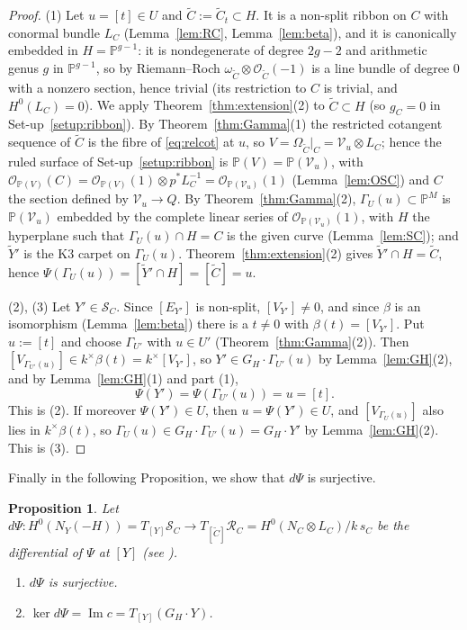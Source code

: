 \documentclass[11pt,twoside]{amsart}
\theoremstyle{plain}
\newtheorem{proposition}[theorem]{Proposition}
\theoremstyle{definition}
\newcommand{\PP}{\mathbb{P}}
\newcommand{\PM}{\mathbb{P}^M}
\newcommand{\OO}{\mathcal{O}}
\renewcommand{\Im}{\operatorname{Im}}
\newcommand{\Yt}{\widetilde{Y}}
\newcommand{\Ct}{\widetilde{C}}
\newcommand{\NY}{N_{Y}}
\newcommand{\SC}{\mathcal{S}_C}
\newcommand{\RC}{\mathcal{R}_C}
\newcommand{\GH}{G_H}
\begin{document}
\begin{proof}
(1) Let $u=[t]\in U$ and $\Ct:=\Ct_t\subset H$. It is a non-split ribbon on $C$ with conormal bundle $L_C$ (Lemma~\ref{lem:RC}, Lemma~\ref{lem:beta}), and it is canonically embedded in $H=\PP^{g-1}$: it is nondegenerate of degree $2g-2$ and arithmetic genus $g$ in $\PP^{g-1}$, so by Riemann--Roch $\omega_{\Ct}\otimes\OO_{\Ct}(-1)$ is a line bundle of degree $0$ with a nonzero section, hence trivial (its restriction to $C$ is trivial, and $H^0(L_C)=0$). We apply Theorem~\ref{thm:extension}(2) to $\Ct\subset H$ (so $g_C=0$ in Set-up~\ref{setup:ribbon}). By Theorem~\ref{thm:Gamma}(1) the restricted cotangent sequence of $\Ct$ is the fibre of \eqref{eq:relcot} at $u$, so $V=\Omega_{\Ct}|_C=\mathcal V_u\otimes L_C$; hence the ruled surface of Set-up~\ref{setup:ribbon} is $\PP(V)=\PP(\mathcal V_u)$, with $\OO_{\PP(V)}(C)=\OO_{\PP(V)}(1)\otimes p^*L_C^{-1}=\OO_{\PP(\mathcal V_u)}(1)$ (Lemma~\ref{lem:OSC}) and $C$ the section defined by $\mathcal V_u\to Q$. By Theorem~\ref{thm:Gamma}(2), $\Gamma_U(u)\subset\PM$ is $\PP(\mathcal V_u)$ embedded by the complete linear series of $\OO_{\PP(\mathcal V_u)}(1)$, with $H$ the hyperplane such that $\Gamma_U(u)\cap H=C$ is the given curve (Lemma~\ref{lem:SC}); and $\Yt'$ is the K3 carpet on $\Gamma_U(u)$. Theorem~\ref{thm:extension}(2) gives $\Yt'\cap H=\Ct$, hence $\Psi(\Gamma_U(u))=[\Yt'\cap H]=[\Ct]=u$.

(2), (3) Let $Y'\in\SC$. Since $[E_{Y'}]$ is non-split, $[V_{Y'}]\ne0$, and since $\beta$ is an isomorphism (Lemma~\ref{lem:beta}) there is a $t\ne0$ with $\beta(t)=[V_{Y'}]$. Put $u:=[t]$ and choose $\Gamma_{U'}$ with $u\in U'$ (Theorem~\ref{thm:Gamma}(2)). Then $[V_{\Gamma_{U'}(u)}]\in k^{\times}\beta(t)=k^{\times}[V_{Y'}]$, so $Y'\in\GH\cdot\Gamma_{U'}(u)$ by Lemma~\ref{lem:GH}(2), and by Lemma~\ref{lem:GH}(1) and part (1),
\[
\Psi(Y')=\Psi(\Gamma_{U'}(u))=u=[t] .
\]
This is (2). If moreover $\Psi(Y')\in U$, then $u=\Psi(Y')\in U$, and $[V_{\Gamma_U(u)}]$ also lies in $k^{\times}\beta(t)$, so $\Gamma_U(u)\in\GH\cdot\Gamma_{U'}(u)=\GH\cdot Y'$ by Lemma~\ref{lem:GH}(2). This is (3).
\end{proof}

Finally in the following Proposition, we show that $d\Psi$ is surjective.

\begin{proposition}\label{prop:dPsi}
Let $d\Psi\colon H^0(\NY(-H))=T_{[Y]}\SC\to T_{[\Ct]}\RC=H^0(N_C\otimes L_C)/k\,s_C$ be the differential of $\Psi$ at $[Y]$ (see ).
\begin{enumerate}
\item $d\Psi$ is surjective.
\item $\ker d\Psi=\Im c=T_{[Y]}(\GH\cdot Y)$.
\end{enumerate}
\end{proposition}
\end{document}
